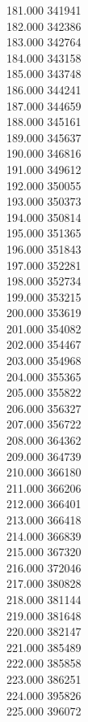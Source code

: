 { 181.000	341941 \\
 182.000	342386 \\
 183.000	342764 \\
 184.000	343158 \\
 185.000	343748 \\
 186.000	344241 \\
 187.000	344659 \\
 188.000	345161 \\
 189.000	345637 \\
 190.000	346816 \\
 191.000	349612 \\
 192.000	350055 \\
 193.000	350373 \\
 194.000	350814 \\
 195.000	351365 \\
 196.000	351843 \\
 197.000	352281 \\
 198.000	352734 \\
 199.000	353215 \\
 200.000	353619 \\
 201.000	354082 \\
 202.000	354467 \\
 203.000	354968 \\
 204.000	355365 \\
 205.000	355822 \\
 206.000	356327 \\
 207.000	356722 \\
 208.000	364362 \\
 209.000	364739 \\
 210.000	366180 \\
 211.000	366206 \\
 212.000	366401 \\
 213.000	366418 \\
 214.000	366839 \\
 215.000	367320 \\
 216.000	372046 \\
 217.000	380828 \\
 218.000	381144 \\
 219.000	381648 \\
 220.000	382147 \\
 221.000	385489 \\
 222.000	385858 \\
 223.000	386251 \\
 224.000	395826 \\
 225.000	396072 \\
}
